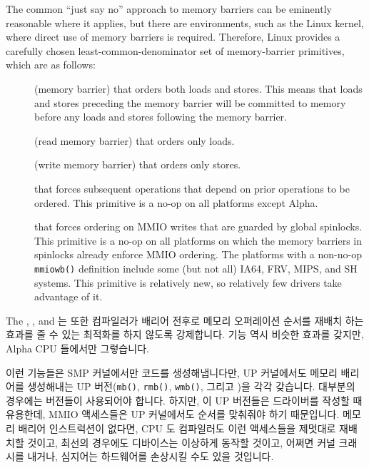 The common ``just say no'' approach to memory barriers
can be eminently reasonable where it applies,
but there are environments, such as the Linux kernel, where direct
use of memory barriers is required.
Therefore,
Linux provides a carefully chosen least-common-denominator
set of memory-barrier primitives, which are as follows:
\begin{description}
\item	[] (memory barrier) that orders both loads and
	stores.
	This means that loads and stores preceding the memory barrier
	will be committed to memory before any loads and stores
	following the memory barrier.
\item	[] (read memory barrier) that orders only loads.
\item	[] (write memory barrier) that orders only stores.
\item	[] that forces subsequent operations
	that depend on prior operations to be ordered.
	This primitive is a no-op on all platforms except Alpha.
\item	[] that forces ordering on MMIO writes that are guarded
	by global spinlocks.
	This primitive is a no-op on all platforms on which the memory
	barriers in spinlocks already enforce MMIO ordering.
	The platforms with a non-no-op {\tt mmiowb()} definition include
	some (but not all) IA64, FRV, MIPS, and SH systems.
	This primitive is relatively new, so relatively few drivers take
	advantage of it.
\end{description}
\fi
The , , and  는 또한 컴파일러가
배리어 전후로 메모리 오퍼레이션 순서를 재배치 하는 효과를 줄 수 있는 최적화를
하지 않도록 강제합니다.
 기능 역시 비슷한 효과를 갖지만, Alpha CPU
들에서만 그렇습니다.

이런 기능들은 SMP 커널에서만 코드를 생성해냅니다만, UP 커널에서도 메모리
배리어를 생성해내는 UP 버전({\tt mb()}, {\tt rmb()}, {\tt wmb()}, 그리고
)을 각각 갖습니다.
대부분의 경우에는  버전들이 사용되어야 합니다.
하지만, 이 UP 버전들은 드라이버를 작성할 때 유용한데, MMIO 액세스들은 UP
커널에서도 순서를 맞춰줘야 하기 때문입니다.
메모리 배리어 인스트럭션이 없다면, CPU 도 컴파일러도 이런 액세스들을 제멋대로
재배치할 것이고, 최선의 경우에도 디바이스는 이상하게 동작할 것이고, 어쩌면 커널
크래시를 내거나, 심지어는 하드웨어를 손상시킬 수도 있을 것입니다.
\iffalse

